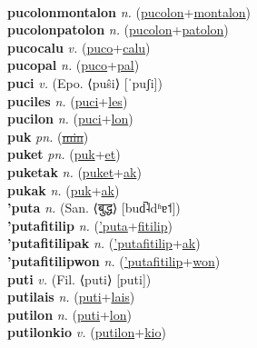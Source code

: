  \label{pucolon} \\
\textbf{pucolonmontalon} \textit{n.} (\hyperref[pucolon]{pucolon}+\hyperref[montalon]{montalon})
 \label{pucolonmontalon} \\
\textbf{pucolonpatolon} \textit{n.} (\hyperref[pucolon]{pucolon}+\hyperref[patolon]{patolon})
 \label{pucolonpatolon} \\
\textbf{pucocalu} \textit{v.} (\hyperref[puco]{puco}+\hyperref[calu]{calu})
 \label{pucocalu} \\
\textbf{pucopal} \textit{n.} (\hyperref[puco]{puco}+\hyperref[pal]{pal})
 \label{pucopal} \\
\textbf{puci} \textit{v.} (Epo. ⟨puŝi⟩ [ˈpuʃi])
 \label{puci} \\
\textbf{puciles} \textit{n.} (\hyperref[puci]{puci}+\hyperref[les]{les})
 \label{puciles} \\
\textbf{pucilon} \textit{n.} (\hyperref[puci]{puci}+\hyperref[lon]{lon})
 \label{pucilon} \\
\textbf{puk} \textit{pn.} (\hyperref[min]{\sout{min}})
 \label{puk} \\
\textbf{puket} \textit{pn.} (\hyperref[puk]{puk}+\hyperref[et]{et})
 \label{puket} \\
\textbf{puketak} \textit{n.} (\hyperref[puket]{puket}+\hyperref[ak]{ak})
 \label{puketak} \\
\textbf{pukak} \textit{n.} (\hyperref[puk]{puk}+\hyperref[ak]{ak})
 \label{pukak} \\
\textbf{'puta} \textit{n.} (San. ⟨बुद्ध⟩ [bud̚˨dʱɐ˦])
 \label{'puta} \\
\textbf{'putafitilip} \textit{n.} (\hyperref['puta]{'puta}+\hyperref[fitilip]{fitilip})
 \label{'putafitilip} \\
\textbf{'putafitilipak} \textit{n.} (\hyperref['putafitilip]{'putafitilip}+\hyperref[ak]{ak})
 \label{'putafitilipak} \\
\textbf{'putafitilipwon} \textit{n.} (\hyperref['putafitilip]{'putafitilip}+\hyperref[won]{won})
 \label{'putafitilipwon} \\
\textbf{puti} \textit{v.} (Fil. ⟨puti⟩ [puti])
 \label{puti} \\
\textbf{putilais} \textit{n.} (\hyperref[puti]{puti}+\hyperref[lais]{lais})
 \label{putilais} \\
\textbf{putilon} \textit{n.} (\hyperref[puti]{puti}+\hyperref[lon]{lon})
 \label{putilon} \\
\textbf{putilonkio} \textit{v.} (\hyperref[putilon]{putilon}+\hyperref[kio]{kio})
 \label{putilonkio} \\
